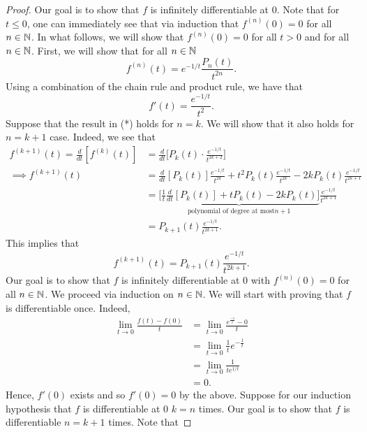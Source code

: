 \documentclass[a4paper]{article}
\begin{document}
\begin{proof}
Our goal is to show that \( f  \) is infinitely differentiable at \( 0  \). Note that for \( t \leq 0  \), one can immediately see that via induction that \( f^{(n)}(0) = 0  \) for all \( n \in \mathbb{N} \). In what follows, we will show that \( f^{(n)}(0) = 0  \) for all \( t > 0  \) and for all \( n \in \mathbb{N} \). First, we will show that for all \( n \in \mathbb{N} \)
\[  f^{(n)}(t) = e^{-1/t} \frac{ {P}_{n}(t) }{ t^{2n} }.   \]
Using a combination of the chain rule and product rule, we have that 
\[ f'(t) = \frac{ e^{-1/t} }{ t^{2} }. \]
Suppose that the result in (*) holds for \( n = k  \). We will show that it also holds for \( n = k +1 \) case. Indeed, we see that 
\begin{align*}
    f^{(k+1)}(t) = \frac{ d }{ dt } [f^{(k)}(t)] &= \frac{ d }{ dt } \Big[ {P}_{k}(t) \cdot \frac{ e^{-1/t} }{ t^{2k+2} } \Big]  \\
    \implies f^{(k+1)}(t) &= \frac{ d }{ dt }  [{P}_{k}(t)] \frac{ e^{-1/t} }{ t^{2k} }  +  t^{2} {P}_{k}(t) \frac{ e^{-1/t} }{ t^{2k} } - 2k {P}_{k}(t) \frac{ e^{-1/t} }{ t^{2k+1} }  \\
                          &= \underbrace{\Big[ \frac{ 1 }{ t } \frac{ d }{ dt } [{P}_{k}(t)] + t {P}_{k}(t) - 2k {P}_{k}(t)\Big]}_{\text{polynomial of degree at most}n+1} \frac{ e^{-1/t} }{ t^{2k+1} }  \\
                          &= {P}_{k+1}(t) \frac{ e^{-1/t} }{ t^{2k+1} }.
\end{align*} 
This implies that 
\[  f^{(k+1)}(t) = {P}_{k+1}(t) \frac{ e^{-1/t} }{ t^{2k+1} }. \]
Our goal is to show that \( f  \) is infinitely differentiable at \( 0  \) with \( f^{(n)} (0) = 0  \) for all \( n \in \mathbb{N} \). We proceed via induction on \( n \in \mathbb{N} \). We will start with proving that \( f  \) is differentiable once. Indeed,  
\begin{align*}
    \lim_{ t \to 0 }  \frac{ f(t) - f(0) }{ t  } &= \lim_{ t \to 0 } \frac{ e^{\frac{ -1 }{ t } } - 0  }{ t  }   \\
                                                 &= \lim_{ t \to 0 }  \frac{ 1 }{ t } e^{- \frac{ 1 }{ t } } \\
                                                 &= \lim_{ t \to 0  }  \frac{ 1 }{ t e^{1/t} } \\
                                                 &= 0.
\end{align*}
Hence, \( f'(0)  \) exists and so \( f'(0) = 0  \) by the above. Suppose for our induction hypothesis that \( f  \) is differentiable at \( 0  \) \( k = n  \) times. Our goal is to show that \( f  \) is differentiable \( n = k + 1  \) times. Note that 

\end{proof}
\end{document}
